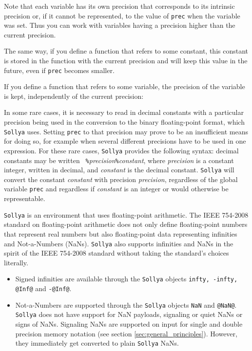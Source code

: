 \documentclass[a4paper]{article}
\newcommand{\com}[1]{\texttt{#1}}
\newcommand{\key}[1]{\texttt{#1}}
\newcommand{\sollya}{\texttt{Sollya}\xspace}
\begin{document}


Note that each variable has its own precision that corresponds to its intrinsic precision or, if it cannot be represented, to the value of \com{prec} when the variable was set. Thus you can work with variables having a precision higher than the current precision.

The same way, if you define a function that refers to some constant, this constant is stored in the function with the current precision and will keep this value in the future, even if \com{prec} becomes smaller.

If you define a function that refers to some variable, the precision of the variable is kept, independently of the current precision:



In some rare cases, it is necessary to read in decimal constants with
a particular precision being used in the conversion to the binary
floating-point format, which \sollya uses. Setting \key{prec} to that
precision may prove to be an insufficient means for doing so, for
example when several different precisions have to be used in one
expression. For these rare cases, \sollya provides the following
syntax: decimal constants may be written {\tt
  \%}\emph{precision}{\tt\%}\emph{constant}, where \emph{precision} is
a constant integer, written in decimal, and \emph{constant} is the
decimal constant. \sollya will convert the constant \emph{constant}
with precision \emph{precision}, regardless of the global variable
\key{prec} and regardless if \emph{constant} is an integer or would
otherwise be representable.



\sollya is an environment that uses floating-point arithmetic. The
IEEE 754-2008 standard on floating-point arithmetic does not only
define floating-point numbers that represent real numbers but also
floating-point data representing infinities and Not-a-Numbers (NaNs).
\sollya also supports infinities and NaNs in the spirit of the IEEE
754-2008 standard without taking the standard's choices literally. 

\begin{itemize}
\item Signed infinities are available through the \sollya objects
\texttt{infty, -infty, @Inf@} and \texttt{-@Inf@}.
\item Not-a-Numbers are supported through the \sollya objects
\texttt{NaN} and \texttt{@NaN@}. \sollya does not have support for NaN
payloads, signaling or quiet NaNs or signs of NaNs. Signaling NaNs
are supported on input for single and double precision memory
notation (see section \ref{sec:general_principles}). However, they
immediately get converted to plain \sollya NaNs.
\end{itemize}
\end{document}

